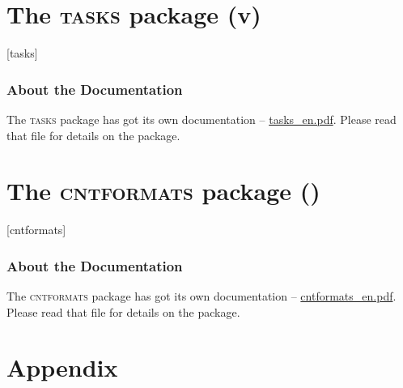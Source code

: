 \documentclass[DIV10,toc=index,toc=bib,numbers=noendperiod]{cnpkgdoc}
\makeatletter
\edef\cntfmtsversion{\@cntfmts@version}
\edef\tasksversion{v\@tasks@version}
\newcommand*\cntformats{{\scshape\textcolor{main}{cntformats}}\xspace}
\newcommand*\Tasks{{\scshape\textcolor{main}{tasks}}\xspace}
\makeatother
\begin{document}
\part{The \Tasks package (\tasksversion)}\label{part:tasks}
\secidx{\Tasks}[tasks]
\section{About the Documentation}
\noindent{}The \Tasks package has got its own documentation --
\url{tasks_en.pdf}.  Please read that file for details on the package.

\part{The \cntformats package (\cntfmtsversion)}
\label{part:cntformats}\secidx{\cntformats}[cntformats]
\section{About the Documentation}
\noindent{}The \cntformats{} package has got its own documentation --
\url{cntformats_en.pdf}.  Please read that file for details on the package.

\appendix
\part{Appendix}
\label{sec:solutions:list}
\printsolutions

\RaggedRight\printbibliography

\printindex
\end{document}
